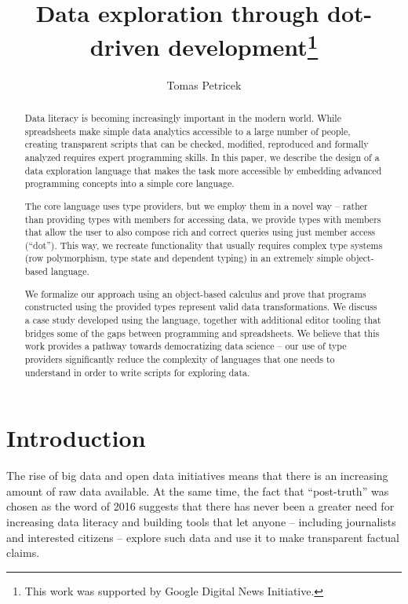 \documentclass[a4paper,UKenglish]{lipics-v2016}
\title{Data exploration through dot-driven development\footnote{This 
  work was supported by Google Digital News Initiative.}}
\author[1]{Tomas Petricek}
\affil[1]{The Alan Turing Institute, London, UK\\
  \texttt{tomas@tomasp.net}}
\theoremstyle{plain}
\theoremstyle{definition}
\begin{document}
\maketitle

\begin{abstract}
Data literacy is becoming increasingly important in the modern world. While spreadsheets make 
simple data analytics accessible to a large number of people, creating transparent scripts that 
can be checked, modified, reproduced and formally analyzed requires expert programming skills. 
In this paper, we describe the design of a data exploration language that makes the task more 
accessible by embedding advanced programming concepts into a simple core language.

The core language uses type providers, but we employ them in a novel way -- rather than providing 
types with members for accessing data, we provide types with members that allow the user to also 
compose rich and correct queries using just member access (``dot''). This way, we recreate 
functionality that usually requires complex type systems (row polymorphism, type state and dependent 
typing) in an extremely simple object-based language.

We formalize our approach using an object-based calculus and prove that programs constructed using 
the provided types represent valid data transformations. We discuss a case study developed using the 
language, together with additional editor tooling that bridges some of the gaps between programming 
and spreadsheets. We believe that this work provides a pathway towards democratizing data science 
-- our use of type providers significantly reduce the complexity of languages that one needs to 
understand in order to write scripts for exploring data.
\end{abstract}


\section{Introduction}
\label{sec:intro}

The rise of big data and open data initiatives means that there is an increasing amount of raw data 
available. At the same time, the fact that ``post-truth'' was chosen as the word of 2016 \cite{posttruth} 
suggests that there has never been a greater need for increasing data literacy and building tools that let 
anyone -- including journalists and interested citizens -- explore such data and use it to make
transparent factual claims.
\end{document}
